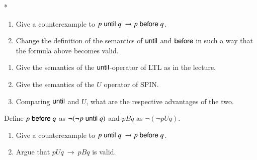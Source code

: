 \begin{question} * \
\begin{enumerate}
\item Give a counterexample to $p\until q \ \rightarrow p\before q$.
\item Change the definition of the semantics of $\mathrel{\mathsf{until}}$ and $\mathrel{\mathsf{before}}$
  in such a way that the formula above becomes valid.
\end{enumerate}
\end{question}




\begin{question} 
\begin{enumerate}
\item Give the semantics of the $\mathrel{\mathsf{until}}$-operator of LTL as in the
  lecture.
\item Give the semantics of the $U$ operator of SPIN.
\item Comparing $\mathrel{\mathsf{until}}$ and $U$, what are the respective advantages
  of the two. 
\end{enumerate}

Define $p\mathrel{\mathsf{before}} q$ as $\neg(\neg p \mathrel{\mathsf{until}} q)$ and $pBq$ as $\neg(\neg
p U q)$.
\begin{enumerate}
\item Give a counterexample to $p\until q \ \rightarrow
  p\before q$.
\item Argue that $p U q \ \rightarrow \ pBq$ is valid.
\end{enumerate}
\end{question}
